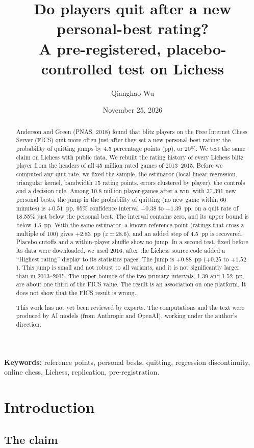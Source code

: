 \documentclass[11pt]{article}
\title{Do players quit after a new personal-best rating?\\ A pre-registered, placebo-controlled test on Lichess}
\author{Qianghao Wu}
\date{November 25, 2026}
\begin{document}
\maketitle
\begin{abstract}
Anderson and Green (PNAS, 2018) found that blitz players on the Free Internet Chess Server (FICS) quit more often just after they set a new personal-best rating: the probability of quitting jumps by 4.5 percentage points (pp), or 20\%. We test the same claim on Lichess with public data. We rebuilt the rating history of every Lichess blitz player from the headers of all 45 million rated games of 2013--2015. Before we computed any quit rate, we fixed the sample, the estimator (local linear regression, triangular kernel, bandwidth 15 rating points, errors clustered by player), the controls and a decision rule. Among 10.8 million player-games after a win, with 37,391 new personal bests, the jump in the probability of quitting (no new game within 60 minutes) is $+0.51$~pp, 95\% confidence interval $-0.38$ to $+1.39$~pp, on a quit rate of 18.55\% just below the personal best. The interval contains zero, and its upper bound is below 4.5~pp. With the same estimator, a known reference point (ratings that cross a multiple of 100) gives $+2.83$~pp ($z=28.6$), and an added step of 4.5~pp is recovered. Placebo cutoffs and a within-player shuffle show no jump. In a second test, fixed before its data were downloaded, we used 2016, after the Lichess source code added a ``Highest rating'' display to its statistics pages. The jump is $+0.88$~pp ($+0.25$ to $+1.52$). This jump is small and not robust to all variants, and it is not significantly larger than in 2013--2015. The upper bounds of the two primary intervals, 1.39 and 1.52~pp, are about one third of the FICS value. The result is an association on one platform. It does not show that the FICS result is wrong.

This work has not yet been reviewed by experts. The computations and the text were produced by AI models (from Anthropic and OpenAI), working under the author's direction.
\end{abstract}
\medskip
\noindent\textbf{Keywords:} reference points, personal bests, quitting, regression discontinuity, online chess, Lichess, replication, pre-registration.

\section{Introduction}

\subsection{The claim}
\end{document}
